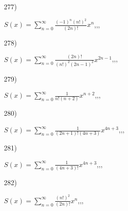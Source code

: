 \documentclass[11pt, ukrainian]{article}
\begin{document}
277) \space 
{%
{$S(x)=\sum\limits_{n=0}^{\infty}{\frac{{(-1)^n}{(n!)^2}}{(2n)!}}{x^{{n}}}$},,, \par \smallskip  
}
\par
\vspace{0.9cm}
278) \space 
{%
{$S(x)=\sum\limits_{n=0}^{\infty}{\frac{(2n)!}{{(n!)^2}{(2n-1)^2}}}{x^{{2n-1}}}$},,, \par \smallskip  
}
\par
\vspace{0.9cm}
279) \space 
{%
{$S(x)=\sum\limits_{n=0}^{\infty}{\frac{1}{n!(n+2)}}{x^{{n+2}}}$},,, \par \smallskip  
}
\par
\vspace{0.9cm}
280) \space 
{%
{$S(x)=\sum\limits_{n=0}^{\infty}{\frac{1}{(2n+1)!(4n+3)}}{x^{{4n+3}}}$},,, \par \smallskip  
}
\par
\newpage
281) \space 
{%
{$S(x)=\sum\limits_{n=0}^{\infty}{\frac{1}{(4n+3)!}}{x^{{4n+3}}}$},,, \par \smallskip  
}
\par
\vspace{0.9cm}
282) \space 
{%
{$S(x)=\sum\limits_{n=0}^{\infty}{\frac{(n!)^2}{(2n)!}}{x^{{n}}}$},,, \par \smallskip  
}
\end{document}
